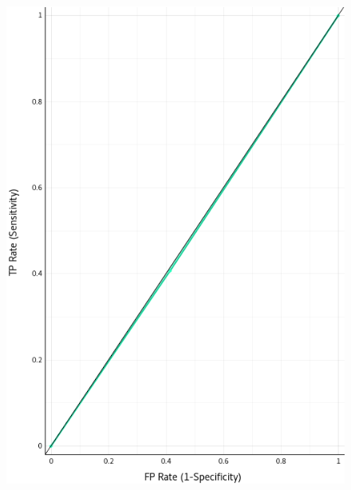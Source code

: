 \begin{figure}[H]
\begin{center}
    \includegraphics{figuras/roc_1-0.png}
\end{center}
\caption{}
\label{fig:class_1.00}
\end{figure}

